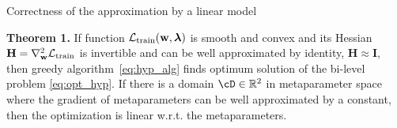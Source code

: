 \documentclass[12pt, aspectratio=169]{beamer}
\begin{document}
\begin{frame}{Correctness of the approximation by a linear model}

\textbf{Theorem 1.} If function $\mathcal{L}_{\textnormal{train}}(\mathbf{w}, \boldsymbol{\lambda})$ is smooth and convex and its Hessian $\mathbf{H} = \nabla_{\mathbf{w}}^2 \mathcal{L}_\textnormal{train}$ is invertible and can be well approximated by identity, $\mathbf{H} \approx \mathbf{I},$ then greedy algorithm~\eqref{eq:hyp_alg} finds optimum solution of the bi-level problem \eqref{eq:opt_hyp}. If there is a domain $\cD \in \bbR^2$ in metaparameter space where the gradient of metaparameters can be well approximated by a constant, then the optimization is linear w.r.t. the metaparameters.

\end{frame}




\end{document}
